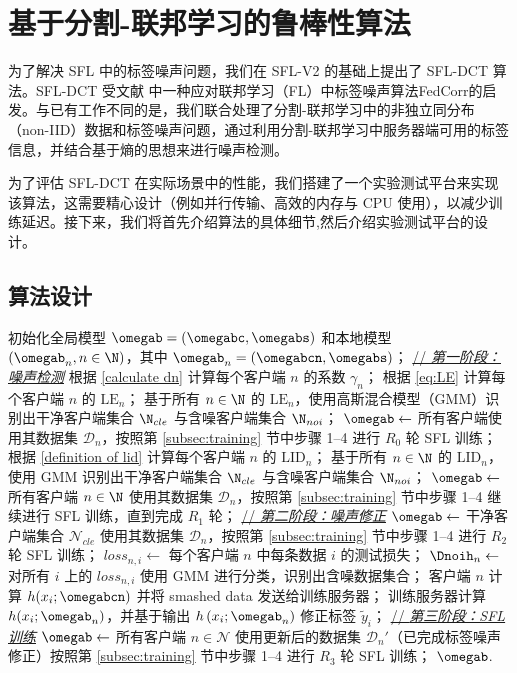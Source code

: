 \chapter{基于分割-联邦学习的鲁棒性算法}
为了解决 SFL 中的标签噪声问题，我们在 SFL-V2 的基础上提出了 SFL-DCT 算法。SFL-DCT 受文献 \cite{b9} 中一种应对联邦学习（FL）中标签噪声算法FedCorr的启发。与已有工作不同的是，我们联合处理了分割-联邦学习中的非独立同分布（non-IID）数据和标签噪声问题，通过利用分割-联邦学习中服务器端可用的标签信息，并结合基于熵的思想来进行噪声检测。

为了评估 SFL-DCT 在实际场景中的性能，我们搭建了一个实验测试平台来实现该算法，这需要精心设计（例如并行传输、高效的内存与 CPU 使用），以减少训练延迟。接下来，我们将首先介绍算法的具体细节,然后介绍实验测试平台的设计。
\section{算法设计}
\begin{algorithm}[t]
\caption{SFL-DCT 算法}\label{alg1}
\begin{algorithmic}[1]
\STATE 初始化全局模型 $\omegab=(\omegabc,\omegabs)$ 和本地模型 $(\omegab_n, n\in\N)$，其中 $\omegab_n = (\omegabcn, \omegabs)$；
\STATE \underline{// \textit{第一阶段：噪声检测}}
\STATE 根据 \eqref{calculate dn} 计算每个客户端 $n$ 的系数 $\gamma_n$；
\STATE 根据 \eqref{eq:LE} 计算每个客户端 $n$ 的 $\text{LE}_n$；
\STATE 基于所有 $n\in\N$ 的 $\text{LE}_{n}$，使用高斯混合模型（GMM）识别出干净客户端集合 $\N_{cle}$ 与含噪客户端集合 $\N_{noi}$；
\ELSE
\STATE $\omegab\leftarrow$ 所有客户端使用其数据集 $\mathcal{D}_n$，按照第 \ref{subsec:training} 节中步骤 1--4 进行 $R_0$ 轮 SFL 训练；
\STATE 根据 \eqref{definition of lid} 计算每个客户端 $n$ 的 $\text{LID}_n$；
\STATE 基于所有 $n\in\N$ 的 $\text{LID}_{n}$，使用 GMM 识别出干净客户端集合 $\N_{cle}$ 与含噪客户端集合 $\N_{noi}$；
\ENDIF
\STATE $\omegab\leftarrow$ 所有客户端 $n\in\N$ 使用其数据集 $\mathcal{D}_n$，按照第 \ref{subsec:training} 节中步骤 1--4 继续进行 SFL 训练，直到完成 $R_1$ 轮；
\STATE \underline{// \textit{第二阶段：噪声修正}}
\STATE $\omegab\leftarrow$ 干净客户端集合 $\mathcal{N}_{cle}$ 使用其数据集 $\mathcal{D}_n$，按照第 \ref{subsec:training} 节中步骤 1--4 进行 $R_2$ 轮 SFL 训练；
\STATE $loss_{n,i} \leftarrow$ 每个客户端 $n$ 中每条数据 $i$ 的测试损失；
\STATE $\Dnoih_n\leftarrow$ 对所有 $i$ 上的 $loss_{n,i}$ 使用 GMM 进行分类，识别出含噪数据集合；
\STATE 客户端 $n$ 计算 $h(x_i;\omegabcn)$ 并将 smashed data 发送给训练服务器；
\STATE 训练服务器计算 $h(x_i;\omegab_n)$，并基于输出 $h\left(x_i;\omegab_n \right)$ 修正标签 $\tilde{y}_i$；
\ENDFOR
\ENDFOR
\STATE \underline{// \textit{第三阶段：SFL 训练}}
\STATE $\omegab\leftarrow$ 所有客户端 $n\in\mathcal{N}$ 使用更新后的数据集 $\mathcal{D}_n'$（已完成标签噪声修正）按照第 \ref{subsec:training} 节中步骤 1--4 进行 $R_3$ 轮 SFL 训练；
\RETURN $\omegab$.
\end{algorithmic}
\end{algorithm}


